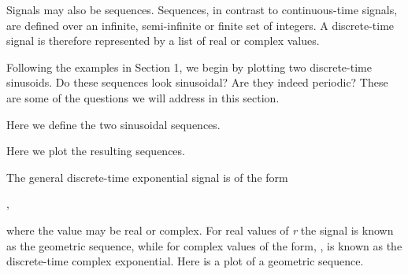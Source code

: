 \documentclass{article}
\begin{document}
\begin{CellGroup}


Signals may also be sequences. Sequences, in contrast to continuous-time  signals, are defined over an infinite, semi-infinite or finite set of integers.
A discrete-time signal is therefore represented by a list of real or complex values.

\begin{CellGroup}
Following the examples in Section 1, we begin by plotting two discrete-time sinusoids. Do these sequences look sinusoidal? Are they indeed periodic?
These are some of the questions we will address in this section.

Here we define the two sinusoidal sequences.

Here we plot the resulting sequences.

\begin{CellGroup}

\end{CellGroup}

\end{CellGroup}
\begin{CellGroup}
The general discrete-time exponential signal is of the form 

	, 



where the value  may be real or complex. For real values of {\itshape r} the signal  is known as the geometric
sequence, while for complex values of the form, , 
is known as the discrete-time complex exponential. Here is a plot of a geometric sequence.



\begin{CellGroup}


\end{CellGroup}
\end{CellGroup}
\end{CellGroup}
\end{document}
